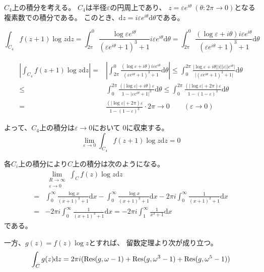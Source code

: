 \documentclass[12pt,b5paper]{ltjsarticle}
\begin{document}
$C_4$上の積分を考える。
$C_4$は半径$\varepsilon$の円周上であり、
$z=\varepsilon e^{i\theta} \ (\theta : 2\pi \to 0)$となる複素数での積分である。
このとき、$\mathrm{d}z = i \varepsilon e^{i\theta}\mathrm{d}\theta$である。

\begin{equation}
 \int_{C_4}f(z+1)\log{z}\mathrm{d}z
  = \int_{2\pi}^{0}
  \frac{\log{\varepsilon e^{i\theta}}}
  {(\varepsilon e^{i\theta}+1)^3+1} i\varepsilon e^{i\theta}\mathrm{d}\theta
  = \int_{2\pi}^{0} \frac{ (\log{\varepsilon}+i\theta) i\varepsilon e^{i\theta}}
{(\varepsilon e^{i\theta}+1)^3+1} \mathrm{d}\theta
\end{equation}

\begin{align}
 \left\lvert
  \int_{C_4}f(z+1)\log{z}\mathrm{d}z
 \right\rvert
  =&
 \left\lvert
   \int_{2\pi}^{0} \frac{ (\log{\varepsilon}+i\theta) i\varepsilon e^{i\theta}}
{(\varepsilon e^{i\theta}+1)^3+1} \mathrm{d}\theta
 \right\rvert
  \leq 
   \int_{0}^{2\pi} \frac{ \lvert \log{\varepsilon}+i\theta \rvert \lvert i \rvert \lvert \varepsilon \rvert \lvert  e^{i\theta} \rvert}
   { \lvert(\varepsilon e^{i\theta}+1)^3+1\rvert} \mathrm{d}\theta \\
 \leq &
   \int_{0}^{2\pi} \frac{ (\lvert \log{\varepsilon} \rvert + i\theta) \varepsilon }
   { 1- \lvert \varepsilon e^{i\theta}+1 \rvert^3} \mathrm{d}\theta
 \leq
   \int_{0}^{2\pi} \frac{ (\lvert \log{\varepsilon} \rvert + 2\pi) \varepsilon }
   { 1- (1-\varepsilon  )^3} \mathrm{d}\theta\\
 = &
   \frac{ (\lvert \log{\varepsilon} \rvert + 2\pi) \varepsilon }
   { 1- (1-\varepsilon  )^3} \cdot 2\pi
 \to 0 \qquad (\varepsilon\to 0)
\end{align}

よって、$C_4$上の積分は$\varepsilon\to0$において
$0$に収束する。
\begin{equation}
 \lim_{\varepsilon\to 0}\int_{C_4}f(z+1)\log{z}\mathrm{d}z=0
\end{equation}

各$C_{i}$上の積分により$C$上の積分は次のようになる。
\begin{align}
 & \lim_{ \substack{R\to\infty \\ \varepsilon\to 0} }\int_{C} f(z)\log{z}\mathrm{d}z \\
  = &
 \int_{0}^{\infty} \frac{\log{x}}{(x+1)^3+1}\mathrm{d}x
 -\int_{0}^{\infty} \frac{ \log{x} }{(x+1)^3 +1}\mathrm{d}x
 - 2\pi i\int_{0}^{\infty} \frac{ 1 }{(x+1)^3 +1}\mathrm{d}x \\
 =& - 2\pi i\int_{0}^{\infty} \frac{ 1 }{(x+1)^3 +1}\mathrm{d}x
 = - 2\pi i\int_{1}^{\infty} \frac{ 1 }{x^3 +1}\mathrm{d}x
\end{align}
である。


一方、$g(z)=f(z)\log{z}$とすれば、
留数定理より次が成り立つ。
\begin{equation}
  \int_{C} g(z)\mathrm{d}z\\
  = 2\pi i (
  \mathrm{Res}(g,\omega-1)
  +
  \mathrm{Res}(g,\omega^3-1)
  +
  \mathrm{Res}(g,\omega^5-1)
  )
\end{equation}







\hrulefill
\end{document}
